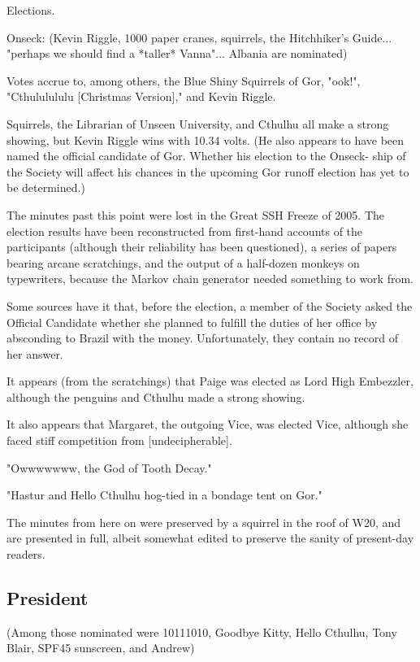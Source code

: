 \documentclass[10pt]{article}
\begin{document}
Elections.

Onseck: (Kevin Riggle, 1000 paper cranes, squirrels, the Hitchhiker's
Guide... "perhaps we should find a *taller* Vanna"... Albania are nominated)

Votes accrue to, among others, the Blue Shiny Squirrels of Gor, "ook!",
"Cthululululu [Christmas Version]," and Kevin Riggle.     

Squirrels, the Librarian of Unseen University, and Cthulhu all make a strong 
showing, but Kevin Riggle wins with 10.34 volts.  (He also appears to have
been named the official candidate of Gor.  Whether his election to the Onseck-
ship of the Society will affect his chances in the upcoming Gor runoff election
has yet to be determined.)

The minutes past this point were lost in the Great SSH Freeze of 2005.  The
election results have been reconstructed from first-hand accounts of the
participants (although their reliability has been questioned), a series of
papers bearing arcane scratchings, and the output of a half-dozen monkeys on
typewriters, because the Markov chain generator needed something to work from.

Some sources have it that, before the election, a member of the Society 
asked the Official Candidate whether she planned to fulfill the duties of
her office by absconding to Brazil with the money.  Unfortunately, they 
contain no record of her answer.

It appears (from the scratchings) that Paige was elected as Lord High Embezzler,
although the penguins and Cthulhu made a strong showing.


It also appears that Margaret, the outgoing Vice, was elected Vice, although
she faced stiff competition from [undecipherable].

"Owwwwwww, the God of Tooth Decay."

"Hastur and Hello Cthulhu hog-tied in a bondage tent on Gor."

The minutes from here on were preserved by a squirrel in the roof of W20,
and are presented in full, albeit somewhat edited to preserve the sanity of
present-day readers.

\subsection*{President} 

(Among those nominated were 10111010, Goodbye Kitty, Hello Cthulhu,
Tony Blair, SPF45 sunscreen, and Andrew)
\end{document}
